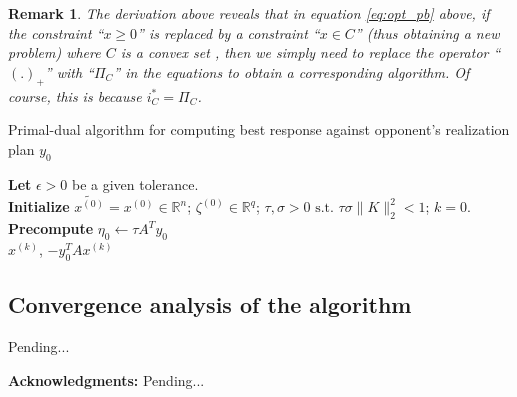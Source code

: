 \documentclass[a4paper,10pt,journal]{IEEEtran}
\newtheorem{remark}{Remark}
\begin{document}
\begin{remark}
The derivation above reveals that in equation \eqref{eq:opt_pb} above, if the constraint ``$x \ge 0$'' is replaced by
a constraint ``$x \in C$'' (thus obtaining a new problem) where $C$ is a convex set
, then we simply need to replace the operator ``$(.)_+$''
with ``$\Pi_C$'' in the equations to obtain a corresponding algorithm. Of course, this is because $i_C^* = \Pi_C$.
\end{remark}

\begin{algorithm}[htb]
\caption{Primal-dual algorithm for computing best response against opponent's realization plan $y_0$}
\textbf{Let} $\epsilon > 0$ be a given tolerance.\\
\textbf{Initialize} $\tilde{x^{(0)}} = x^{(0)} \in \mathbb{R}^n$; $\zeta^{(0)} \in \mathbb{R}^{q}$;
$\tau, \sigma > 0 \text{ s.t. }\tau\sigma \|K\|_2^2 < 1$; $k = 0$.\\
\textbf{Precompute} $\eta_0 \leftarrow \tau A^Ty_0$\\
 \Return $x^{(k)}$, $-y_0^TAx^{(k)}$
\label{Tab:pseudocode_pb}
\end{algorithm}

\subsection{Convergence analysis of the algorithm}
Pending...

\medskip \noindent
\textbf{Acknowledgments:}
Pending...

 
\end{document}
